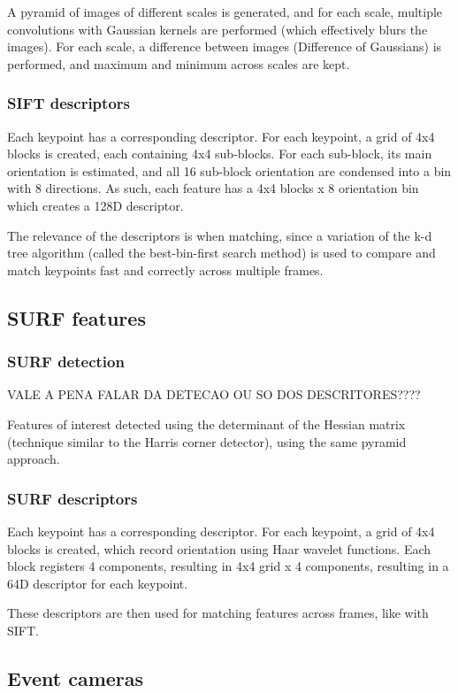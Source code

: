 A pyramid of images of different scales is generated, and for each scale, multiple convolutions with Gaussian kernels are performed (which effectively blurs the images). For each scale, a difference between images (Difference of Gaussians) is performed, and maximum and minimum across scales are kept.

\subsubsection{SIFT descriptors}

Each keypoint has a corresponding descriptor. For each keypoint, a grid of  4x4 blocks is created, each containing 4x4 sub-blocks. For each sub-block, its main orientation is estimated, and all 16 sub-block orientation are condensed into a bin with 8 directions. As such, each feature has a 4x4 blocks x 8 orientation bin which creates a 128D descriptor.

The relevance of the descriptors is when matching, since a variation of the k-d tree algorithm (called the best-bin-first search method) is used to compare and match keypoints fast and correctly across multiple frames.

\subsection{SURF features}
\subsubsection{SURF detection}
VALE A PENA FALAR DA DETECAO OU SO DOS DESCRITORES????

Features of interest detected using the determinant of the Hessian matrix (technique similar to the Harris corner detector), using the same pyramid approach.


\subsubsection{SURF descriptors}

Each keypoint has a corresponding descriptor. For each keypoint, a grid of  4x4 blocks is created, which record orientation using Haar wavelet functions. Each block registers 4 components, resulting in 4x4 grid x 4 components, resulting in a 64D descriptor for each keypoint.

These descriptors are then used for matching features across frames, like with SIFT.

\subsection{Event cameras}

